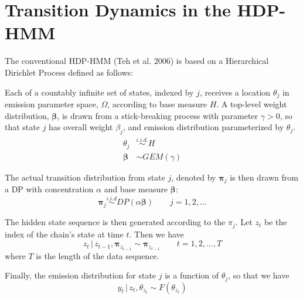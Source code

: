 \documentclass[12pt,letterpaper]{report}
\newcommand{\given}{\, \vert \,}
\newcommand{\bbeta}{\boldsymbol{\beta}}
\newcommand{\bpi}{\boldsymbol{\pi}}
\begin{document}
\section{Transition Dynamics in the HDP-HMM}
\label{sec:transition-dynamics}

The conventional HDP-HMM (Teh et al. 2006) is based on a 
Hierarchical Dirichlet Process defined as follows:

Each of a countably infinite set of states, indexed by $j$, receives a
location $\theta_j$ in emission parameter space, $\Omega$, according to 
base measure $H$.  A top-level
weight distribution, $\bbeta$, is drawn from a stick-breaking
process with parameter $\gamma > 0$, so that state $j$ has overall
weight $\beta_j$, and emission distribution parameterized by $\theta_j$.
\begin{align}
\theta_j &\stackrel{i.i.d.}{\sim} H \\
\bbeta &\sim GEM(\gamma)
\end{align}

The actual transition distribution from state $j$, denoted by $\bpi_j$
is then drawn from a DP with concentration $\alpha$ and base measure $\bbeta$:
\begin{equation}
  \label{eq:1}
  \bpi_j \stackrel{i.i.d}{\sim} DP(\alpha \bbeta) \qquad j = 1, 2, \dots
\end{equation}

The hidden state sequence is then generated according to the $\pi_j$.
Let $z_t$ be the index of the chain's state at time $t$.  Then we have
\begin{equation}
  \label{eq:4}
  z_t \given z_{t-1}, \bpi_{z_{t-1}} \sim \bpi_{z_{t-1}} \qquad t = 1, 2, \dots, T
\end{equation}
where $T$ is the length of the data sequence.

Finally, the emission distribution for state $j$ is a function of
$\theta_j$, so that we have
\begin{equation}
  \label{eq:5}
  y_t \given z_{t}, \theta_{z_t} \sim F(\theta_{z_t})
\end{equation}
\end{document}

